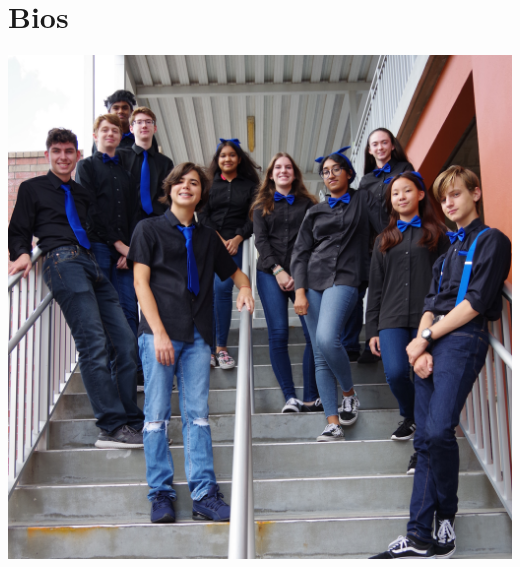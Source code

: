 \documentclass[
letterpaper, %
11pt, %
twoside,
onecolumn, %
openright, %
]{report}
\begin{document}
\chapter{Bios}
\vspace{3em}
\begin{minipage}[c]{\linewidth}
\centering
\includegraphics[width=\linewidth]{Images/Team/Team75-Square.JPG}
\end{minipage}























\end{document}

